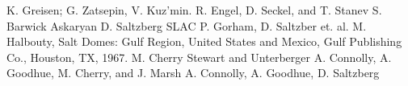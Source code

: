 \documentclass{article}
\begin{document}
  \begin{thebibliography}{00}
    
    
    
    
  K. Greisen;
    G. Zatsepin, V. Kuz'min.
  R. Engel, D. Seckel, and T. Stanev
  S. Barwick
  Askaryan
  D. Saltzberg SLAC
  P. Gorham, D. Saltzber et. al.
  M. Halbouty, Salt Domes: Gulf Region, United States and Mexico, Gulf Publishing Co., Houston, TX, 1967.
  M. Cherry
  Stewart and Unterberger
  A. Connolly, A. Goodhue, M. Cherry, and J. Marsh
  A. Connolly, A. Goodhue, D. Saltzberg
    
  \end{thebibliography}
  
\end{document}
